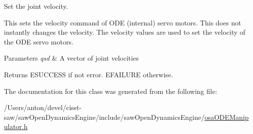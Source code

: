 Set the joint velocity. 

This sets the velocity command of O\+D\+E (internal) servo motors. This does not instantly changes the velocity. The velocity values are used to set the velocity of the O\+D\+E servo motors. 
\begin{DoxyParams}{Parameters}
{\em qsd} & A vector of joint velocities \\
\hline
\end{DoxyParams}
\begin{DoxyReturn}{Returns}
E\+S\+U\+C\+C\+E\+S\+S if not error. E\+F\+A\+I\+L\+U\+R\+E otherwise. 
\end{DoxyReturn}


The documentation for this class was generated from the following file\+:\begin{DoxyCompactItemize}
\item 
/\+Users/anton/devel/cisst-\/saw/saw\+Open\+Dynamics\+Engine/include/saw\+Open\+Dynamics\+Engine/\hyperlink{osa_o_d_e_manipulator_8h}{osa\+O\+D\+E\+Manipulator.\+h}\end{DoxyCompactItemize}
